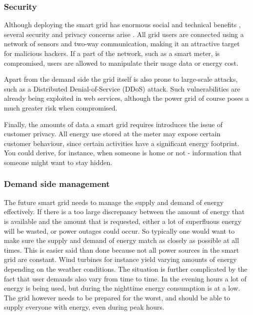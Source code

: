 \subsubsection{Security}
Although deploying the smart grid has enormous social and technical benefits , several security and privacy concerns arise \cite{McDanielMcLaughlin2009a}. All grid users are connected using a network of sensors and two-way communication, making it an attractive target for malicious hackers. If a part of the network, such as a smart meter, is compromised, users are allowed to manipulate their usage data or energy cost. 

Apart from the demand side the grid itself is also prone to large-scale attacks, such as a Distributed Denial-of-Service (DDoS) attack. Such vulnerabilities are already being exploited in web services, although the power grid of course poses a much greater risk when compromised.

Finally, the amounts of data a smart grid requires introduces the issue of customer privacy. All energy use stored at the meter may expose certain customer behaviour, since certain activities have a significant energy footprint. You could derive, for instance, when someone is home or not - information that someone might want to stay hidden.


\subsubsection{Demand side management}

The future smart grid needs to manage the supply and demand of energy effectively. If there is a too large discrepancy between the amount of energy that is available and the amount that is requested, either a lot of superfluous energy will be wasted, or power outages could occur.
So typically one would want to make sure the supply and demand of energy match as closely as possible at all times. This is easier said than done because not all power sources in the smart grid are constant. Wind turbines for instance yield varying amounts of energy depending on the weather conditions. The situation is further complicated by the fact that user demands also vary from time to time. In the evening hours a lot of energy is being used, but during the nighttime energy consumption is at a low. The grid however needs to be prepared for the worst, and should be able to supply everyone with energy, even during peak hours.

